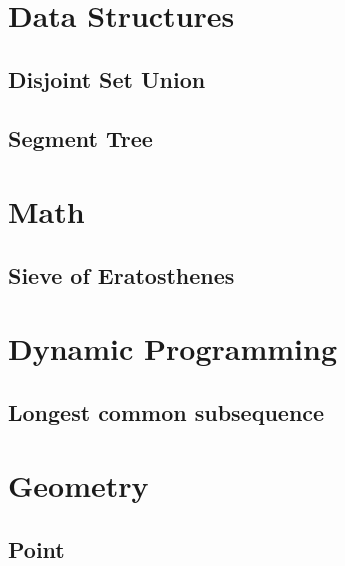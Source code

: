 \section{Data Structures}
\subsection{Disjoint Set Union}
\raggedbottom
\hrulefill
\subsection{Segment Tree}
\raggedbottom
\hrulefill

\section{Math}
\subsection{Sieve of Eratosthenes}
\raggedbottom
\hrulefill

\section{Dynamic Programming}
\subsection{Longest common subsequence}
\raggedbottom
\hrulefill

\section{Geometry}
\subsection{Point}
\raggedbottom
\hrulefill

